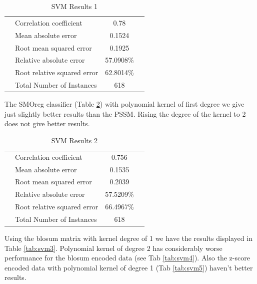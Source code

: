 \begin{table}[ht]
\begin{center}
\begin{tabular}{ ll c r }
\hline
 & Correlation coefficient &                 0.78  \\
 & Mean absolute error      &                0.1524 \\
 & Root mean squared error   &               0.1925 \\
 & Relative absolute error    &             57.0908\%  \\
 & Root relative squared error &            62.8014\%  \\
 & Total Number of Instances    &          618 \\
\hline
\end{tabular}
\caption{SVM Results 1}\label{tab:svm1}
\end{center}
\end{table}


The SMOreg classifier (Table \ref{tab:svm2}) with polynomial kernel of first degree we give just slightly better results than the PSSM. Rising the degree of the kernel to 2 does not give better results.

\begin{table}[ht]
\begin{center}
\begin{tabular}{ ll c r }
\hline
 & Correlation coefficient &                 0.756 \\
 & Mean absolute error      &                0.1535 \\
 & Root mean squared error   &               0.2039 \\
 & Relative absolute error   &              57.5209\% \\
 & Root relative squared error &            66.4967\% \\
 & Total Number of Instances    &          618 \\
\hline
\end{tabular}
\caption{SVM Results 2}\label{tab:svm2}
\end{center}
\end{table}

Using the blosum matrix with kernel degree of 1 we have the results displayed in Table \ref{tab:svm3}. Polynomial kernel of degree 2 has considerably worse performance for the blosum encoded data (see Tab \ref{tab:svm4}). Also the z-score encoded data with polynomial kernel of degree 1 (Tab \ref{tab:svm5}) haven't better results.



